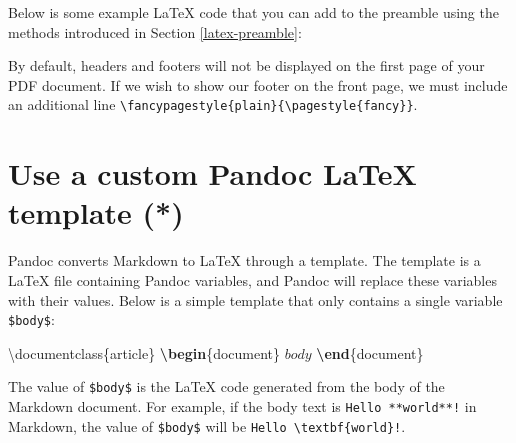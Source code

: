 \documentclass[
  11pt,
]{krantz}
\newenvironment{Shaded}{\begin{snugshade}}{\end{snugshade}}
\newcommand{\BuiltInTok}[1]{#1}
\newcommand{\CommentTok}[1]{\textcolor[rgb]{0.37,0.37,0.37}{\textit{#1}}}
\newcommand{\ExtensionTok}[1]{#1}
\newcommand{\FunctionTok}[1]{\textcolor[rgb]{0,0,0}{#1}}
\newcommand{\KeywordTok}[1]{\textcolor[rgb]{0.27,0.27,0.27}{\textbf{#1}}}
\newcommand{\NormalTok}[1]{#1}
\newcommand{\SpecialStringTok}[1]{\textcolor[rgb]{0.5,0.5,0.5}{#1}}
\begin{document}
Below is some example LaTeX code that you can add to the preamble using the methods introduced in Section \ref{latex-preamble}:

\begin{Shaded}
\end{Shaded}

By default, headers and footers will not be displayed on the first page of your PDF document. If we wish to show our footer on the front page, we must include an additional line \texttt{\textbackslash{}fancypagestyle\{plain\}\{\textbackslash{}pagestyle\{fancy\}\}}.

\hypertarget{latex-template}{%
\section{Use a custom Pandoc LaTeX template (*)}\label{latex-template}}

Pandoc converts Markdown to LaTeX through a template. The template is a LaTeX file containing Pandoc variables, and Pandoc will replace these variables with their values. Below is a simple template that only contains a single variable \texttt{\$body\$}:

\begin{Shaded}
\begin{Highlighting}[]
\BuiltInTok{\textbackslash{}documentclass}\NormalTok{\{}\ExtensionTok{article}\NormalTok{\}}
\KeywordTok{\textbackslash{}begin}\NormalTok{\{}\ExtensionTok{document}\NormalTok{\}}
\SpecialStringTok{$body$}
\KeywordTok{\textbackslash{}end}\NormalTok{\{}\ExtensionTok{document}\NormalTok{\}}
\end{Highlighting}
\end{Shaded}

The value of \texttt{\$body\$} is the LaTeX code generated from the body of the Markdown document. For example, if the body text is \texttt{Hello\ **world**!} in Markdown, the value of \texttt{\$body\$} will be \texttt{Hello\ \textbackslash{}textbf\{world\}!}.
\end{document}
